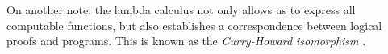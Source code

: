 On another note, the lambda calculus not only allows us to express all computable functions, but also establishes a correspondence between logical proofs and programs. This is known as the \emph{Curry-Howard isomorphism} \cite{girardProofsTypes1989}.













